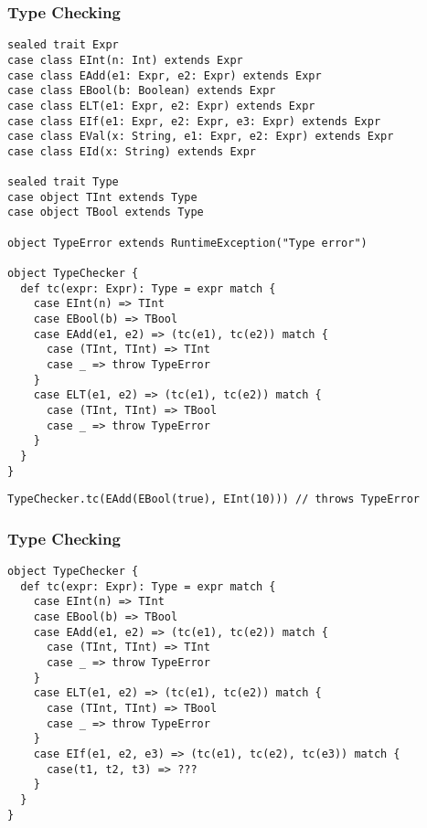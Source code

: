 \documentclass[8pt,pdf]{beamer}
\begin{document}
\begin{frame}[fragile]
\frametitle{Type Checking}

\begin{lstlisting}
sealed trait Expr
case class EInt(n: Int) extends Expr
case class EAdd(e1: Expr, e2: Expr) extends Expr
case class EBool(b: Boolean) extends Expr
case class ELT(e1: Expr, e2: Expr) extends Expr
case class EIf(e1: Expr, e2: Expr, e3: Expr) extends Expr
case class EVal(x: String, e1: Expr, e2: Expr) extends Expr
case class EId(x: String) extends Expr

sealed trait Type
case object TInt extends Type
case object TBool extends Type

object TypeError extends RuntimeException("Type error")

object TypeChecker {
  def tc(expr: Expr): Type = expr match {
    case EInt(n) => TInt
    case EBool(b) => TBool
    case EAdd(e1, e2) => (tc(e1), tc(e2)) match {
      case (TInt, TInt) => TInt
      case _ => throw TypeError
    }
    case ELT(e1, e2) => (tc(e1), tc(e2)) match {
      case (TInt, TInt) => TBool
      case _ => throw TypeError
    }
  }
}
\end{lstlisting}

\pause
\begin{lstlisting}
TypeChecker.tc(EAdd(EBool(true), EInt(10))) // throws TypeError
\end{lstlisting}
\end{frame}

\begin{frame}[fragile]
\frametitle{Type Checking}

\begin{lstlisting}
object TypeChecker {
  def tc(expr: Expr): Type = expr match {
    case EInt(n) => TInt
    case EBool(b) => TBool
    case EAdd(e1, e2) => (tc(e1), tc(e2)) match {
      case (TInt, TInt) => TInt
      case _ => throw TypeError
    }
    case ELT(e1, e2) => (tc(e1), tc(e2)) match {
      case (TInt, TInt) => TBool
      case _ => throw TypeError
    }
    case EIf(e1, e2, e3) => (tc(e1), tc(e2), tc(e3)) match {
      case(t1, t2, t3) => ???
    }
  }
}
\end{lstlisting}
\end{frame}
\end{document}
